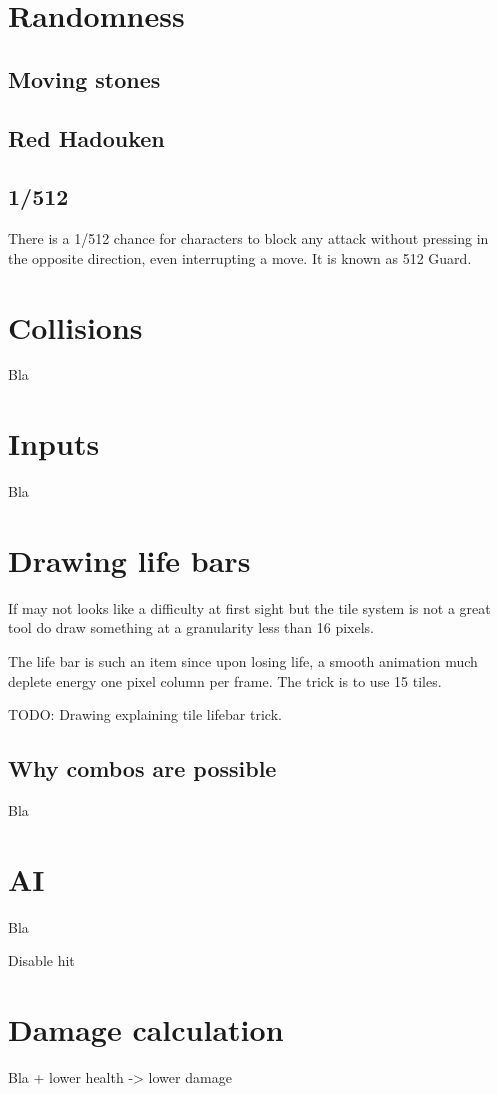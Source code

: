 
\section{Randomness}
\subsection{Moving stones}
\subsection{Red Hadouken}
\subsection{1/512}

There is a 1/512 chance for characters to block any attack without pressing in the opposite direction, even interrupting a move. It is known as 512 Guard.

\section{Collisions}
Bla
\section{Inputs}
Bla

\section{Drawing life bars}
If may not looks like a difficulty at first sight but the tile system is not a great tool do draw something at a granularity less than 16 pixels. 

The life bar is such an item since upon losing life, a smooth animation much deplete energy one pixel column per frame. The trick is to use 15 tiles.

TODO: Drawing explaining tile lifebar trick.


\subsection{Why combos are possible}
Bla
\section{AI}
Bla

Disable hit

\section{Damage calculation}
Bla + lower health -> lower damage

